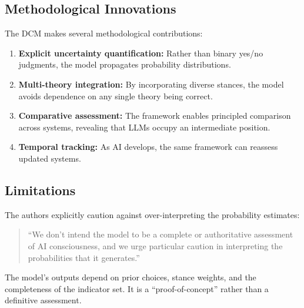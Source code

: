 \subsection{Methodological Innovations}

The DCM makes several methodological contributions:

\begin{enumerate}
    \item \textbf{Explicit uncertainty quantification:} Rather than binary yes/no judgments, the model propagates probability distributions.

    \item \textbf{Multi-theory integration:} By incorporating diverse stances, the model avoids dependence on any single theory being correct.

    \item \textbf{Comparative assessment:} The framework enables principled comparison across systems, revealing that LLMs occupy an intermediate position.

    \item \textbf{Temporal tracking:} As AI develops, the same framework can reassess updated systems.
\end{enumerate}

\subsection{Limitations}

The authors explicitly caution against over-interpreting the probability estimates:

\begin{quote}
``We don't intend the model to be a complete or authoritative assessment of AI consciousness, and we urge particular caution in interpreting the probabilities that it generates.''~\citep[p.~6]{shiller2026dcm}
\end{quote}

The model's outputs depend on prior choices, stance weights, and the completeness of the indicator set. It is a ``proof-of-concept'' rather than a definitive assessment.
